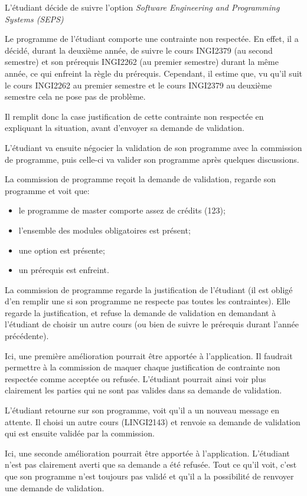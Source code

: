 L'étudiant décide de suivre l'option \textit{Software Engineering and Programming Systems (SEPS)}

Le programme de l'étudiant comporte une contrainte non respectée. En effet, il a décidé, durant la deuxième année, de suivre le cours INGI2379 (au second semestre)  et son prérequis INGI2262 (au premier semestre) durant la même année, ce qui enfreint la règle du prérequis. Cependant, il estime que, vu qu'il suit le cours INGI2262 au premier semestre et le cours INGI2379 au deuxième semestre cela ne pose pas de problème.

Il remplit donc la case justification de cette contrainte non respectée en expliquant la situation, avant d'envoyer sa demande de validation. 

L'étudiant va ensuite négocier la validation de son programme avec la commission de programme, puis celle-ci va valider son programme après quelques discussions. 

La commission de programme reçoit la demande de validation, regarde son programme et voit que:
\begin{itemize}
\item le programme de master comporte assez de crédits (123);
\item l'ensemble des modules obligatoires est présent;
\item une option est présente;
\item un prérequis est enfreint.
\end{itemize}

La commission de programme regarde la justification de l'étudiant (il est obligé d'en remplir une si son programme ne respecte pas toutes les contraintes). Elle regarde la justification, et refuse la demande de validation en demandant à l'étudiant de choisir un autre cours (ou bien de suivre le prérequis durant l'année précédente).

Ici, une première amélioration pourrait être apportée à l'application. Il faudrait permettre à la commission de maquer chaque justification de contrainte non respectée comme acceptée ou refusée. L'étudiant pourrait ainsi voir plus clairement les parties qui ne sont pas valides dans sa demande de validation.  

L'étudiant retourne sur son programme, voit qu'il a un nouveau message en attente. Il choisi un autre cours (LINGI2143) et renvoie sa demande de validation qui est ensuite validée par la commission.

Ici, une seconde amélioration pourrait être apportée à l'application. L'étudiant n'est pas clairement averti que sa demande a été refusée. Tout ce qu'il voit, c'est que son programme n'est toujours pas validé et qu'il a la possibilité de renvoyer une demande de validation. 

